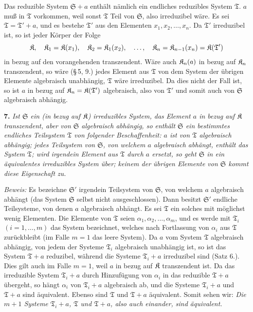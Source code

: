 Das reduzible System $\mathfrak S+a$ enthält nämlich ein endliches reduzibles System $\mathfrak T$. $a$ muß in $\mathfrak T$ vorkommen, weil sonst $\mathfrak T$ Teil von $\mathfrak S$, also irreduzibel wäre. Es sei $\mathfrak T=\mathfrak T'+a$, und es bestehe $\mathfrak T'$ aus den Elementen $x_1,x_2,\ldots,x_n$. Da $\mathfrak T'$ irreduzibel ist, so ist jeder Körper der Folge
\[
\mathfrak K,
\quad \mathfrak K_1=\mathfrak K(x_1),
\quad \mathfrak K_2=\mathfrak K_1(x_2),
\quad \ldots,
\quad \mathfrak K_n=\mathfrak K_{n-1}(x_n)=\mathfrak K(\mathfrak T')
\]
in bezug auf den vorangehenden transzendent. Wäre auch $\mathfrak K_n(a)$ in bezug auf $\mathfrak K_n$ transzendent, so wäre (\S\,5, 9.) jedes Element aus $\mathfrak T$ von dem System der übrigen Elemente algebraisch unabhängig, $\mathfrak T$ wäre irreduzibel. Da dies nicht der Fall ist, so ist $a$ in bezug auf $\mathfrak K_n=\mathfrak K(\mathfrak T')$ algebraisch, also von $\mathfrak T'$ und somit auch von $\mathfrak S$ algebraisch abhängig.

\textbf{7.} \emph{Ist $\mathfrak S$ ein (in bezug auf $\mathfrak K$) irreduzibles System, das Element $a$ in bezug auf $\mathfrak K$ transzendent, aber von $\mathfrak S$ algebraisch abhängig, so enthält $\mathfrak S$ ein bestimmtes endliches Teilsystem $\mathfrak T$ von folgender Beschaffenheit: $a$ ist von $\mathfrak T$ algebraisch abhängig; jedes Teilsystem von $\mathfrak S$, von welchem $a$ algebraisch abhängt, enthält das System $\mathfrak T$; wird irgendein Element aus $\mathfrak T$ durch $a$ ersetzt, so geht $\mathfrak S$ in ein äquivalentes irreduzibles System über; keinem der übrigen Elemente von $\mathfrak S$ kommt diese Eigenschaft zu.}

\emph{Beweis:} Es bezeichne $\mathfrak S'$ irgendein Teilsystem von $\mathfrak S$, von welchem $a$ algebraisch abhängt (das System $\mathfrak S$ selbst nicht ausgeschlossen). Dann besitzt $\mathfrak S'$ endliche Teilsysteme, von denen $a$ algebraisch abhängt. Es sei $\mathfrak T$ ein solches mit möglichst wenig Elementen. Die Elemente von $\mathfrak T$ seien $\alpha_1,\alpha_2,\ldots,\alpha_m$, und es werde mit $\mathfrak T_i$ $(i=1,\ldots,m)$ das System bezeichnet, welches nach Fortlassung von $\alpha_i$ aus $\mathfrak T$ zurückbleibt (im Falle $m=1$ das leere System). Da $a$ vom System $\mathfrak T$ algebraisch abhängig, von jedem der Systeme $\mathfrak T_i$ algebraisch unabhängig ist, so ist das System $\mathfrak T+a$ reduzibel, während die Systeme $\mathfrak T_i+a$ irreduzibel sind (Satz 6.). Dies gilt auch im Falle $m=1$, weil $a$ in bezug auf $\mathfrak K$ transzendent ist. Da das irreduzible System $\mathfrak T_i+a$ durch Hinzufügung von $\alpha_i$ in das reduzible $\mathfrak T+a$ übergeht, so hängt $\alpha_i$ von $\mathfrak T_i+a$ algebraisch ab, und die Systeme $\mathfrak T_i+a$ und $\mathfrak T+a$ sind äquivalent. Ebenso sind $\mathfrak T$ und $\mathfrak T+a$ äquivalent. Somit sehen wir: \emph{Die $m+1$ Systeme $\mathfrak T_i+a$, $\mathfrak T$ und $\mathfrak T+a$, also auch einander, sind äquivalent.}

